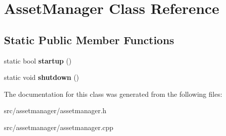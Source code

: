 \hypertarget{class_asset_manager}{}\section{Asset\+Manager Class Reference}
\label{class_asset_manager}
\subsection*{Static Public Member Functions}
\begin{DoxyCompactItemize}
\item 
\hypertarget{class_asset_manager_aa0992043239d47bb65cd4d19d37307a8}{}static bool {\bfseries startup} ()\label{class_asset_manager_aa0992043239d47bb65cd4d19d37307a8}

\item 
\hypertarget{class_asset_manager_adc5f8e045c162d29c639fbc07e28bf53}{}static void {\bfseries shutdown} ()\label{class_asset_manager_adc5f8e045c162d29c639fbc07e28bf53}

\end{DoxyCompactItemize}


The documentation for this class was generated from the following files\+:\begin{DoxyCompactItemize}
\item 
src/assetmanager/assetmanager.\+h\item 
src/assetmanager/assetmanager.\+cpp\end{DoxyCompactItemize}
